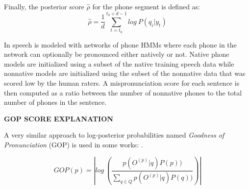 Finally, the posterior score $\hat{\rho}$ for the phone segment is defined as:
\begin{equation}
\hat{\rho} = \frac{1}{d}\sum_{t=t_{0}}^{t_{0}+d-1} log \ P(q_{i}|y_{t})
\end{equation}

In \cite{detection_mispronunciation_instruction}
speech is modeled with networks of phone HMMs where each phone in the network can optionally
be pronounced either natively or not. Native phone models are initialized using a subset of
the native training speech data while nonnative models are initialized using the subset of 
the nonnative data that was scored low by the human raters. A mispronunciation score for each
sentence is then computed as a ratio between the number of nonnative phones to the total 
number of phones in the sentence.

\textbf{GOP SCORE EXPLANATION}

A very similar approach to log-posterior probabilities named \textit{Goodness of Pronunciation}
(GOP) is used in some works: \cite{gop_1} \cite{gop_2} \cite{gop_3}. 

\begin{equation}
GOP(p) = \left| log \ \left(\frac{p(O^{(p)}|q)P(p))}{\sum_{q \in Q}p(O^{(p)}|q)P(q))}\right) \right| 
\end{equation}

